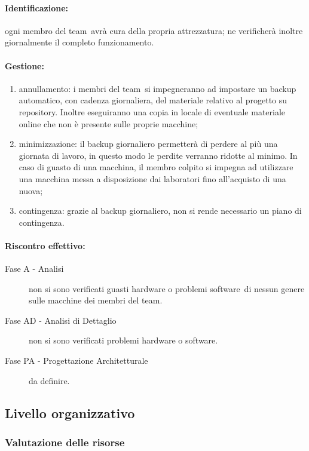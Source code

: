 \documentclass[../PianoProgetto.tex]{subfiles}
\begin{document}
	\paragraph*{Identificazione:} ogni membro del team\g\ avrà cura della propria attrezzatura; ne verificherà inoltre giornalmente il completo funzionamento.
	
	\paragraph*{Gestione:}
	\begin{enumerate}
		\item annullamento: i membri del team\g\ si impegneranno ad impostare un backup automatico, con cadenza giornaliera, del materiale relativo al progetto su repository\g . Inoltre eseguiranno una copia in locale di eventuale materiale online che non è presente sulle proprie macchine;
		\item minimizzazione: il backup giornaliero permetterà di perdere al più una giornata di lavoro, in questo modo le perdite verranno ridotte al minimo. In caso di guasto di una macchina, il membro colpito si impegna ad utilizzare una macchina messa a disposizione dai laboratori fino all'acquisto di una nuova;
		\item contingenza: grazie al backup giornaliero, non si rende necessario un piano di contingenza.
	\end{enumerate} 	
	
	\paragraph*{Riscontro effettivo:}
		\begin{description}
			\item[Fase A - Analisi] non si sono verificati guasti hardware o problemi software\g\ di nessun genere sulle macchine dei membri del team\g .
			\item[Fase AD - Analisi di Dettaglio] non si sono verificati problemi hardware o software\g.
			\item[Fase PA - Progettazione Architetturale] da definire.
		\end{description}

\newpage
\subsection{Livello organizzativo}

\subsubsection{Valutazione delle risorse}
\label{sec:Valutazione delle risorse}
\end{document}
